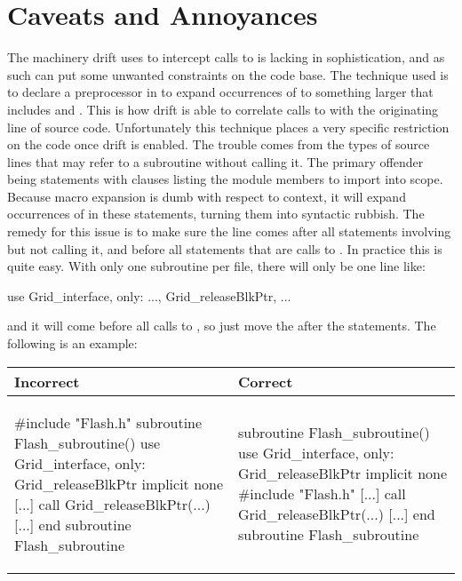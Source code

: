 \section{Caveats and Annoyances}
The machinery drift uses to intercept calls to  is lacking in
sophistication, and as such can put some unwanted constraints on the code base.
The technique used is to declare a preprocessor  in 
to expand occurrences of  to something larger that includes
 and .  This is how drift is able to
correlate calls to  with the originating line of
source code.  Unfortunately this technique places a very specific restriction on the
code once drift is enabled.  The trouble comes from the types of source lines that
may refer to a subroutine without calling it.  The primary offender being 
statements with  clauses listing the module members to import into scope.
Because macro expansion is dumb with respect to context, it will expand occurrences
of  in these  statements, turning them into
syntactic rubbish.  The remedy for this issue is to make sure the line
 comes after all statements involving
 but not calling it, and before all statements that
are calls to .  In practice this is quite easy.  With
only one subroutine per file, there will only be one line like:
\begin{codeseg}
use Grid\_interface, only: ..., Grid\_releaseBlkPtr, ...
\end{codeseg}
and it will come before all calls to , so just move
the  after the  statements.  The following is an example:

\vspace{0.1 in}

\begin{tabular}{|p{}|p{}|}
\hline
Incorrect & Correct \\
\hline
\begin{scriptsize}
\begin{codeseg}
#include "Flash.h"
subroutine Flash_subroutine()
  use Grid_interface, only: Grid_releaseBlkPtr
  implicit none
  [...]
  call Grid_releaseBlkPtr(...)
  [...]
end subroutine Flash_subroutine
\end{codeseg}
\end{scriptsize}
&
\begin{scriptsize}
\begin{codeseg}
subroutine Flash_subroutine()
  use Grid_interface, only: Grid_releaseBlkPtr
  implicit none
#include "Flash.h"
  [...]
  call Grid_releaseBlkPtr(...)
  [...]
end subroutine Flash_subroutine
\end{codeseg}
\end{scriptsize}
\\
\hline
\end{tabular}


